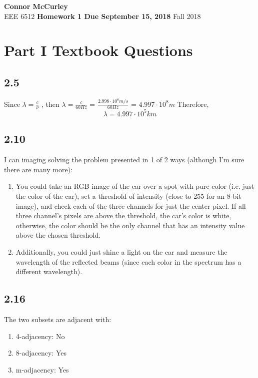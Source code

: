 \documentclass{article}[12 pt]
\begin{document}
	
\begin{center}
	\textbf{\Large Connor McCurley} \\
	EEE 6512 \qquad \textbf{\large Homework 1 Due September 15, 2018} \qquad Fall 2018 
\end{center}

\section*{Part I Textbook Questions}

\subsection*{2.5}

Since $\lambda = \frac{c}{\nu}$ , then  $\lambda = \frac{c}{60Hz}$ = $\frac{2.998 \cdot 10^8 m/s}{60Hz}$ = $4.997 \cdot 10^8m$ Therefore, \[ \boxed{\lambda = 4.997 \cdot 10^5 km} \]

\subsection*{2.10}
I can imaging solving the problem presented in 1 of 2 ways (although I'm sure there are many more):
\begin{enumerate}
\item You could take an RGB image of the car over a spot with pure color (i.e. just the color of the car), set a threshold of intensity (close to 255 for an 8-bit image), and check each of the three channels for just the center pixel.  If all three channel's pixels are above the threshold, the car's color is white, otherwise, the color should be the only channel that has an intensity value above the chosen threshold.

\item Additionally, you could just shine a light on the car and measure the wavelength of the reflected beams (since each color in the spectrum has a different wavelength).

\end{enumerate}


\subsection*{2.16}

The two subsets are adjacent with:
\begin{enumerate}
\item 4-adjacency: No 
\item 8-adjacency: Yes
\item m-adjacency: Yes
\end{enumerate}
\end{document}
